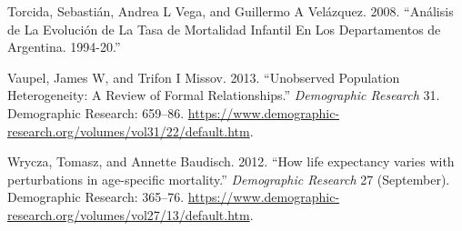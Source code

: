 \documentclass[12pt,]{article}
\begin{document}
\leavevmode\hypertarget{ref-torcida2008}{}%
Torcida, Sebastián, Andrea L Vega, and Guillermo A Velázquez. 2008.
``Análisis de La Evolución de La Tasa de Mortalidad Infantil En Los
Departamentos de Argentina. 1994-20.''

\leavevmode\hypertarget{ref-Vaupel_Missov_2013}{}%
Vaupel, James W, and Trifon I Missov. 2013. ``Unobserved Population
Heterogeneity: A Review of Formal Relationships.'' \emph{Demographic
Research} 31. Demographic Research: 659--86.
\url{https://www.demographic-research.org/volumes/vol31/22/default.htm}.

\leavevmode\hypertarget{ref-Wrycza2012}{}%
Wrycza, Tomasz, and Annette Baudisch. 2012. ``How life expectancy varies
with perturbations in age-specific mortality.'' \emph{Demographic
Research} 27 (September). Demographic Research: 365--76.
\url{https://www.demographic-research.org/volumes/vol27/13/default.htm}.
\end{document}
